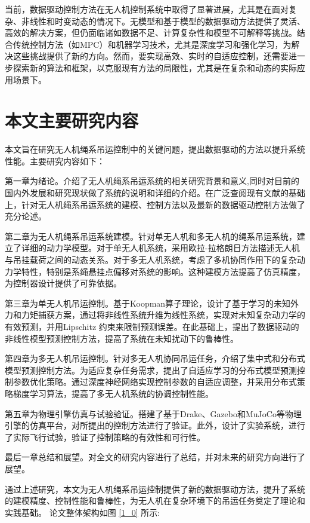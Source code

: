 \documentclass[lang=chs, degree=master, blindreview=false, winfonts=true]{yanputhesis}
\begin{document}
当前，数据驱动控制方法在无人机控制系统中取得了显著进展，尤其是在面对复杂、非线性和时变动态的情况下。无模型和基于模型的数据驱动方法提供了灵活、高效的解决方案，但仍面临诸如数据不足、计算复杂性和模型不可解释等挑战。结合传统控制方法（如MPC）和机器学习技术，尤其是深度学习和强化学习，为解决这些挑战提供了新的方向。然而，要实现高效、实时的自适应控制，还需要进一步探索新的算法和框架，以克服现有方法的局限性，尤其是在复杂和动态的实际应用场景下。
\section{本文主要研究内容}
本文旨在研究无人机绳系吊运控制中的关键问题，提出数据驱动的方法以提升系统性能。主要研究内容如下：

第一章为绪论。介绍了无人机绳系吊运系统的相关研究背景和意义,同时对目前的国内外发展和研究现状做了系统的说明和详细的介绍。在广泛查阅现有文献的基础上，针对无人机绳系吊运系统的建模、控制方法以及最新的数据驱动控制方法做了充分论述。

第二章为无人机绳系吊运系统建模。针对单无人机和多无人机的绳系吊运系统，建立了详细的动力学模型。对于单无人机系统，采用欧拉-拉格朗日方法描述无人机与吊挂载荷之间的动态关系。对于多无人机系统，考虑了多机协同作用下的复杂动力学特性，特别是系绳悬挂点偏移对系统的影响。这种建模方法提高了仿真精度，为控制器设计提供了可靠依据。 

第三章为单无人机吊运控制。基于Koopman算子理论，设计了基于学习的未知外力和力矩捕获方案，通过将非线性系统升维为线性系统，实现对未知复杂动力学的有效预测，并用Lipschitz 约束来限制预测误差。在此基础上，提出了数据驱动的非线性模型预测控制方法，提高了系统在未知扰动下的鲁棒性。

第四章为多无人机吊运控制。针对多无人机协同吊运任务，介绍了集中式和分布式模型预测控制方法。为适应复杂任务需求，提出了自适应学习的分布式模型预测控制参数优化策略。通过深度神经网络实现控制参数的自适应调整，并采用分布式策略梯度学习算法，提高了多无人机系统的协调控制性能。

第五章为物理引擎仿真与试验验证。搭建了基于Drake、Gazebo和MuJoCo等物理引擎的仿真平台，对所提出的控制方法进行了验证。此外，设计了实验系统，进行了实际飞行试验，验证了控制策略的有效性和可行性。

最后一章总结和展望。对全文的研究内容进行了总结，并对未来的研究方向进行了展望。

通过上述研究，本文为无人机绳系吊运控制提供了新的数据驱动方法，提升了系统的建模精度、控制性能和鲁棒性，为无人机在复杂环境下的吊运任务奠定了理论和实践基础。
论文整体架构如图 \ref{1_0} 所示:
\end{document}
